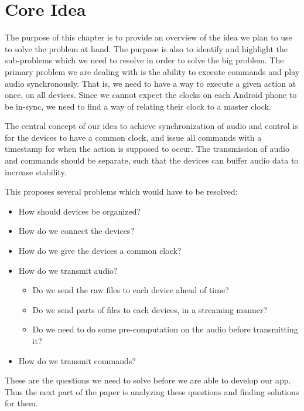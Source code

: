 \chapter{Core Idea} %

The purpose of this chapter is to provide an overview of the idea we plan to use to solve the problem at hand.
The purpose is also to identify and highlight the sub-problems which we need to resolve in order to solve the big problem.
The primary problem we are dealing with is the ability to execute commands and play audio synchronously.
That is, we need to have a way to execute a given action at once, on all devices.
Since we cannot expect the clocks on each Android phone to be in-sync, we need to find a way of relating their clock to a master clock.

The central concept of our idea to achieve synchronization of audio and control is for the devices to have a common clock, and issue all commands with a timestamp for when the action is supposed to occur.
The transmission of audio and commands should be separate, such that the devices can buffer audio data to increase stability.

This proposes several problems which would have to be resolved:
\begin{itemize}
    \item How should devices be organized?
    \item How do we connect the devices?
    \item How do we give the devices a common clock?
    \item How do we transmit audio?
    \begin{itemize}
        \item Do we send the raw files to each device ahead of time?
        \item Do we send parts of files to each devices, in a streaming manner?
        \item Do we need to do some pre-computation on the audio before transmitting it?
    \end{itemize}
    \item How do we transmit commands?
\end{itemize}

These are the questions we need to solve before we are able to develop our app.
Thus the next part of the paper is analyzing these questions and finding solutions for them.

